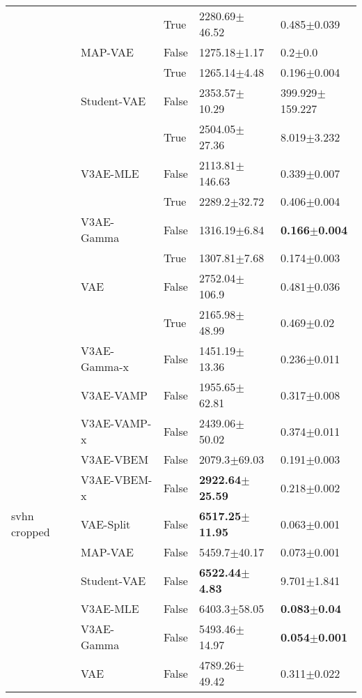 \begin{tabular}{lllll}
             &     & True  &           2280.69$\pm$46.52 &           0.485$\pm$0.039 \\
             & MAP-VAE & False &            1275.18$\pm$1.17 &               0.2$\pm$0.0 \\
             &     & True  &            1265.14$\pm$4.48 &           0.196$\pm$0.004 \\
             & Student-VAE & False &           2353.57$\pm$10.29 &       399.929$\pm$159.227 \\
             &     & True  &           2504.05$\pm$27.36 &           8.019$\pm$3.232 \\
             & V3AE-MLE & False &          2113.81$\pm$146.63 &           0.339$\pm$0.007 \\
             &     & True  &            2289.2$\pm$32.72 &           0.406$\pm$0.004 \\
             & V3AE-Gamma & False &            1316.19$\pm$6.84 &  \textbf{0.166$\pm$0.004} \\
             &     & True  &            1307.81$\pm$7.68 &           0.174$\pm$0.003 \\
             & VAE & False &           2752.04$\pm$106.9 &           0.481$\pm$0.036 \\
             &     & True  &           2165.98$\pm$48.99 &            0.469$\pm$0.02 \\
             & V3AE-Gamma-x & False &           1451.19$\pm$13.36 &           0.236$\pm$0.011 \\
             & V3AE-VAMP & False &           1955.65$\pm$62.81 &           0.317$\pm$0.008 \\
             & V3AE-VAMP-x & False &           2439.06$\pm$50.02 &           0.374$\pm$0.011 \\
             & V3AE-VBEM & False &            2079.3$\pm$69.03 &           0.191$\pm$0.003 \\
             & V3AE-VBEM-x & False &  \textbf{2922.64$\pm$25.59} &           0.218$\pm$0.002 \\
svhn cropped & VAE-Split & False &  \textbf{6517.25$\pm$11.95} &           0.063$\pm$0.001 \\
             & MAP-VAE & False &            5459.7$\pm$40.17 &           0.073$\pm$0.001 \\
             & Student-VAE & False &   \textbf{6522.44$\pm$4.83} &           9.701$\pm$1.841 \\
             & V3AE-MLE & False &            6403.3$\pm$58.05 &   \textbf{0.083$\pm$0.04} \\
             & V3AE-Gamma & False &           5493.46$\pm$14.97 &  \textbf{0.054$\pm$0.001} \\
             & VAE & False &           4789.26$\pm$49.42 &           0.311$\pm$0.022 \\
\bottomrule
\end{tabular}


